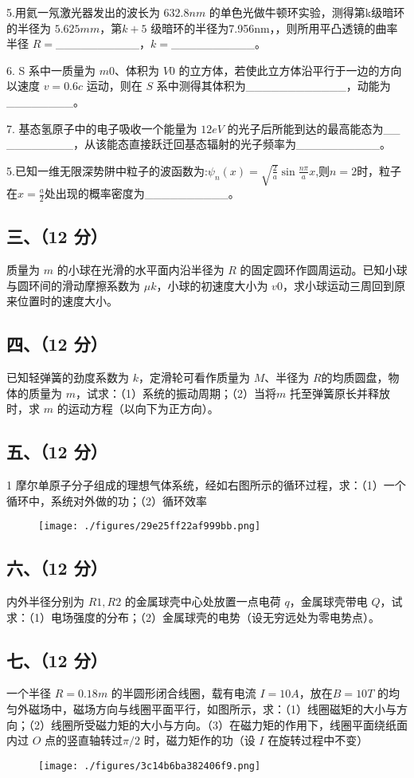 5.用氦一氖激光器发出的波长为 $632.8nm$ 的单色光做牛顿环实验，测得第k级暗环的半径为 $5.625mm$，第$k+5$ 级暗环的半径为7.956nm，，则所用平凸透镜的曲率半径 $R=$__________，$k=$__________。

6. S 系中一质量为 $m0$、体积为 $V0$ 的立方体，若使此立方体沿平行于一边的方向以速度 $v=0.6c$ 运动，则在 $S$ 系中测得其体积为____________，动能为________。

7. 基态氢原子中的电子吸收一个能量为 $12eV$ 的光子后所能到达的最高能态为__
________，从该能态直接跃迁回基态辐射的光子频率为__________。

5.已知一维无限深势阱中粒子的波函数为:$\psi_n(x)=\sqrt{\frac{2}{a}}\sin\frac{n\pi}{a}x$,则$n=2$时，粒子在$x=\frac{a}{2}$处出现的概率密度为__________。
\subsection{三、（12 分）}
质量为 $m$ 的小球在光滑的水平面内沿半径为 $R$ 的固定圆环作圆周运动。已知小球与圆环间的滑动摩擦系数为 $\mu k$，小球的初速度大小为 $v0$，求小球运动三周回到原来位置时的速度大小。
\subsection{四、（12 分）}
已知轻弹簧的劲度系数为 $k$，定滑轮可看作质量为 $M$、半径为 $R$的均质圆盘，物体的质量为 $m$，试求：（1）系统的振动周期；（2）当将$m$ 托至弹簧原长并释放时，求 $m$ 的运动方程（以向下为正方向）。
\subsection{五、（12 分）}
1 摩尔单原子分子组成的理想气体系统，经如右图所示的循环过程，求：（1）一个循环中，系统对外做的功；（2）循环效率
\begin{figure}[ht]
\centering
\texttt{[image: ./figures/29e25ff22af999bb.png]}
\caption{} \label{fig_NJU05_1}
\end{figure}
\subsection{六、（12 分）}
内外半径分别为 $R1,R2$ 的金属球壳中心处放置一点电荷 $q$，金属球壳带电 $Q$，试求：（1）电场强度的分布；（2）金属球壳的电势（设无穷远处为零电势点）。
\subsection{七、（12 分）}
一个半径 $R=0.18m$ 的半圆形闭合线圈，载有电流 $I=10A$，放在$B=10T$ 的均匀外磁场中，磁场方向与线圈平面平行，如图所示，求：（1）线圈磁矩的大小与方向；（2）线圈所受磁力矩的大小与方向。（3）在磁力矩的作用下，线圈平面绕纸面内过 $O$ 点的竖直轴转过$\pi/2$ 时，磁力矩作的功（设 $I$ 在旋转过程中不变）
\begin{figure}[ht]
\centering
\texttt{[image: ./figures/3c14b6ba382406f9.png]}
\caption{} \label{fig_NJU05_2}
\end{figure}
